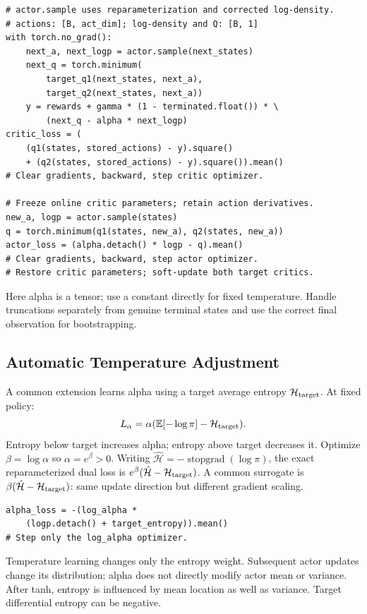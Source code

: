 \begin{verbatim}
# actor.sample uses reparameterization and corrected log-density.
# actions: [B, act_dim]; log-density and Q: [B, 1]
with torch.no_grad():
    next_a, next_logp = actor.sample(next_states)
    next_q = torch.minimum(
        target_q1(next_states, next_a),
        target_q2(next_states, next_a))
    y = rewards + gamma * (1 - terminated.float()) * \
        (next_q - alpha * next_logp)
critic_loss = (
    (q1(states, stored_actions) - y).square()
    + (q2(states, stored_actions) - y).square()).mean()
# Clear gradients, backward, step critic optimizer.

# Freeze online critic parameters; retain action derivatives.
new_a, logp = actor.sample(states)
q = torch.minimum(q1(states, new_a), q2(states, new_a))
actor_loss = (alpha.detach() * logp - q).mean()
# Clear gradients, backward, step actor optimizer.
# Restore critic parameters; soft-update both target critics.
\end{verbatim}
Here alpha is a tensor; use a constant directly for fixed temperature.
Handle truncations separately from genuine terminal states and use
the correct final observation for bootstrapping.

\subsection{Automatic Temperature Adjustment}
A common extension learns alpha using a target average entropy
$\mathcal H_{\rm target}$. At fixed policy:
\begin{equation}
L_\alpha=\alpha(\mathbb{E}[-\log\pi]-\mathcal H_{\rm target}).
\end{equation}
Entropy below target increases alpha; entropy above target decreases it.
Optimize $\beta=\log\alpha$ so $\alpha=e^\beta>0$.
Writing $\hat{\mathcal H}=-\operatorname{stopgrad}(\log\pi)$,
the exact reparameterized dual loss is
$e^\beta(\hat{\mathcal H}-\mathcal H_{\rm target})$.
A common surrogate is
$\beta(\hat{\mathcal H}-\mathcal H_{\rm target})$:
same update direction but different gradient scaling.
\begin{verbatim}
alpha_loss = -(log_alpha *
    (logp.detach() + target_entropy)).mean()
# Step only the log_alpha optimizer.
\end{verbatim}
Temperature learning changes only the entropy weight.
Subsequent actor updates change its distribution; alpha does not
directly modify actor mean or variance.
After tanh, entropy is influenced by mean location as well as variance.
Target differential entropy can be negative.

